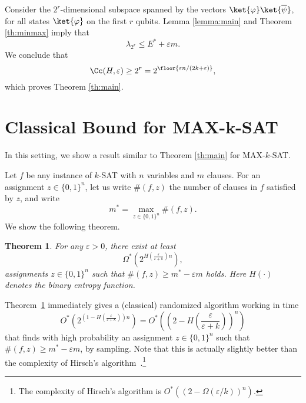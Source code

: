 \documentclass[11pt,a4paper]{article}
\theoremstyle{plain}
\newtheorem{theorem}{Theorem}
\theoremstyle{definition}
\begin{document}
Consider the $2^r$-dimensional subspace spanned by the vectors $\ket{\varphi}\ket{\overline\psi}$, for all states $\ket{\varphi}$ on the first $r$ qubits. Lemma \ref{lemma:main} and Theorem \ref{th:minmax} imply that 
\[
\lambda_{2^r}\le E^\ast+\varepsilon m.
\]
We conclude that 
\[
\Cc(H,\varepsilon)\ge 2^r= 2^{\floor{\varepsilon n/(2k+\varepsilon)}},
\]
which proves Theorem \ref{th:main}.

\appendix
\section{Classical Bound for MAX-$\boldsymbol{k}$-SAT}\label{classical}
In this setting, we show a result similar to Theorem \ref{th:main} for MAX-$k$-SAT.

Let $f$ be any instance of $k$-SAT with $n$ variables and $m$ clauses. For an assignment $z\in\{0,1\}^n$, let us write $\#(f,z)$ the number of clauses in $f$ satisfied by $z$, and write 
\[
m^\ast=\max_{z\in\{0,1\}^n}\#(f,z).
\]
We show the following theorem. 
\begin{theorem}\label{th:class}
	For any $\varepsilon>0$, there exist at least 
	\[
	\Omega^\ast\left(2^{H\left(\frac{\varepsilon}{\varepsilon+k}\right) n}\right),
	\]
	 assignments $z\in\{0,1\}^n$ such that $\#(f,z)\ge m^\ast-\varepsilon m$ holds.
	Here $H(\cdot)$ denotes the binary entropy function.
\end{theorem}
Theorem~\ref{th:class} immediately gives a (classical) randomized algorithm working in time
\[
O^\ast\left(2^{\left(1-H\left(\frac{\varepsilon}{\varepsilon+k}\right)\right) n}\right)
=
O^\ast\left(\left(2- H\left(\frac{\varepsilon}{\varepsilon+k}\right)\right)^n\right)
\]
that finds with high probability an assignment $z\in\{0,1\}^n$ such that $\#(f,z)\ge m^\ast-\varepsilon m$, by sampling. Note that this is actually slightly better than the complexity of Hirsch's algorithm~\cite{Hirsch03}.\footnote{The complexity of Hirsch's algorithm is $O^\ast((2-\Omega(\varepsilon/k))^n)$.}
\end{document}
